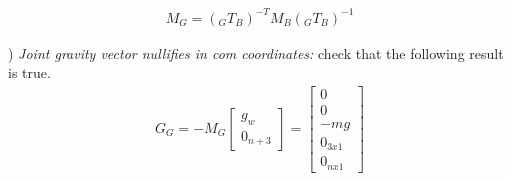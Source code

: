 \documentclass{report}
\newcommand{\mat}[1]{\ensuremath{\begin{bmatrix}#1\end{bmatrix}}}	%
\begin{document}
\begin{align}
M_G = ({}_GT_B)^{-T} M_B ({}_GT_B)^{-1}
\label{fig:}
\end{align}

\quad

) \textit{Joint gravity vector nullifies in com coordinates:} check that the following result is true.
\begin{align}
G_G = -M_G \mat{g_w \\ 0_{n+3}} = \mat{0 \\0\\ -mg  \\ 0_{3x1} \\0_{nx1} }
\label{fig:}
\end{align}

\end{document}
